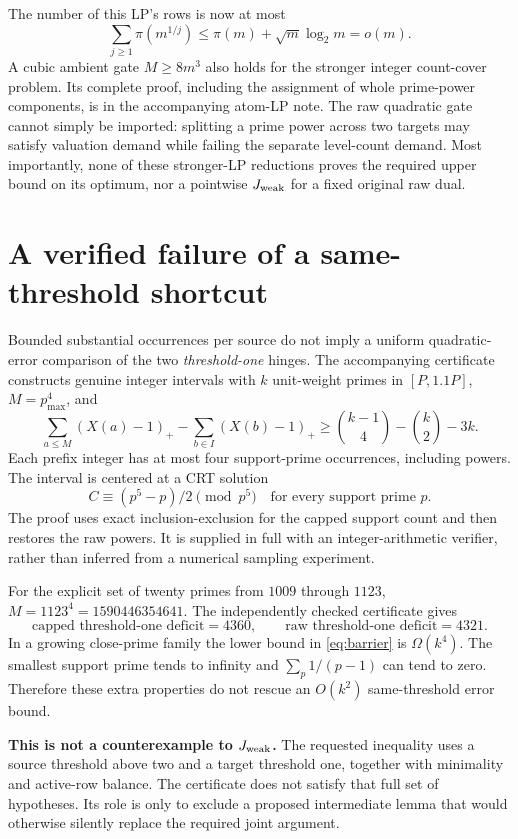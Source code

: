 \documentclass[11pt,a4paper]{article}
\theoremstyle{remark}\newtheorem{remark}[theorem]{Remark}
\begin{document}
The number of this LP's rows is now at most
\[
 \sum_{j\ge1}\pi(m^{1/j})
 \le\pi(m)+\sqrt m\log_2m=o(m).
\]
A cubic ambient gate \(M\ge8m^3\) also holds for the stronger integer
count-cover problem. Its complete proof, including the assignment
of whole prime-power components, is in the accompanying atom-LP
note. The raw quadratic gate cannot simply be imported: splitting
a prime power across two targets may satisfy valuation demand while
failing the separate level-count demand. Most importantly, none of
these stronger-LP reductions proves the required upper bound on its
optimum, nor a pointwise \(J_{\rm weak}\) for a fixed original raw dual.

\section{A verified failure of a same-threshold shortcut}

Bounded substantial occurrences per source do not imply a uniform
quadratic-error comparison of the two \emph{threshold-one} hinges.
The accompanying certificate constructs genuine integer intervals
with \(k\) unit-weight primes in \([P,1.1P]\), \(M=p_{\max}^4\), and
\begin{equation}
 \sum_{a\le M}(X(a)-1)_+-\sum_{b\in I}(X(b)-1)_+
 \ge\binom{k-1}{4}-\binom k2-3k.
 \label{eq:barrier}
\end{equation}
Each prefix integer has at most four support-prime occurrences,
including powers. The interval is centered at a CRT solution
\[
 C\equiv(p^5-p)/2\pmod{p^5}
 \quad\text{for every support prime }p.
\]
The proof uses exact inclusion-exclusion for the capped support count
and then restores the raw powers. It is supplied in full with an
integer-arithmetic verifier, rather than inferred from a numerical
sampling experiment.

For the explicit set of twenty primes from \(1009\) through \(1123\),
\(M=1123^4=1590446354641\). The independently checked certificate gives
\[
 \text{capped threshold-one deficit}=4360,\qquad
 \text{raw threshold-one deficit}=4321.
\]
In a growing close-prime family the lower bound in \eqref{eq:barrier}
is \(\Omega(k^4)\). The smallest support prime tends to infinity and
\(\sum_p1/(p-1)\) can tend to zero. Therefore these extra properties
do not rescue an \(O(k^2)\) same-threshold error bound.

\textbf{This is not a counterexample to \(J_{\rm weak}\).} The
requested inequality uses a source threshold above two and a target
threshold one, together with minimality and active-row balance. The
certificate does not satisfy that full set of hypotheses. Its role
is only to exclude a proposed intermediate lemma that would otherwise
silently replace the required joint argument.
\end{document}
